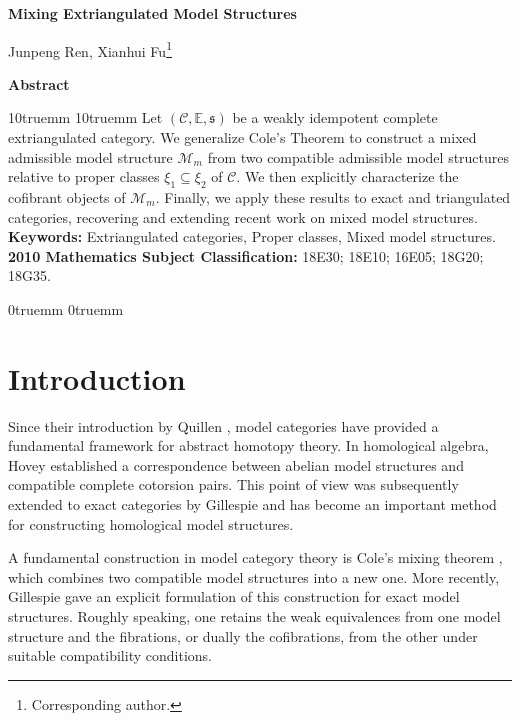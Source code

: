 \documentclass[11pt,a4paper]{amsart}
\date{}
\numberwithin{equation}{section}
\theoremstyle{plain}
\begin{document}
\begin{center}
	{\large  \bf  Mixing Extriangulated Model Structures}
	
	\vspace{0.5cm}  Junpeng Ren,  Xianhui Fu\footnote{Corresponding author.}\\
	\medskip
	
	
\end{center}

\bigskip
\centerline { \bf  Abstract}
\medskip

\leftskip10truemm \rightskip10truemm \noindent
\hspace{1em} Let $(\mathscr{C}, \mathbb{E}, \mathfrak{s})$ be a weakly idempotent complete extriangulated category. We generalize Cole's Theorem to construct a mixed admissible model structure $\mathcal{M}_m$ from two compatible admissible model structures relative to proper classes $\xi_1 \subseteq \xi_2$ of $\mathscr{C}$. We then explicitly characterize the cofibrant objects of $\mathcal{M}_m$. Finally, we apply these results to exact and triangulated categories, recovering and extending recent work on mixed model structures.\\[2mm]
{\bf Keywords:} Extriangulated categories, Proper classes, Mixed model structures. \\
{\bf 2010 Mathematics Subject Classification:} 18E30; 18E10; 16E05; 18G20; 18G35.

\leftskip0truemm \rightskip0truemm
\section { \bf Introduction}



Since their introduction by Quillen \cite{Quillen_1967}, model categories have
provided a fundamental framework for abstract homotopy theory. In
homological algebra, Hovey \cite{hovey2002cotorsion} established a
correspondence between abelian model structures and compatible complete
cotorsion pairs. This point of view was subsequently extended to exact
categories by Gillespie \cite{gillespie2011model} and has become an
important method for constructing homological model structures.

A fundamental construction in model category theory is Cole's mixing
theorem \cite{cole2006mixing}, which combines two compatible model
structures into a new one. More recently, Gillespie \cite{Gillespie_2025}
gave an explicit formulation of this construction for exact model
structures. Roughly speaking, one retains the weak equivalences from one
model structure and the fibrations, or dually the cofibrations, from the
other under suitable compatibility conditions.
\end{document}
